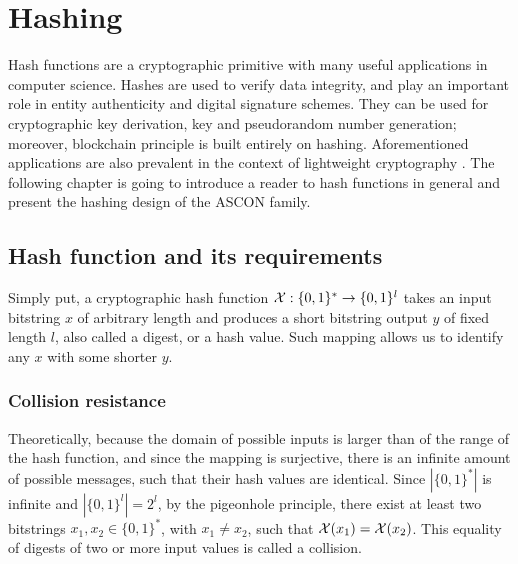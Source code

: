 

\section{Hashing}
Hash functions are a cryptographic primitive with many useful applications in computer science. Hashes are used to verify data integrity, and play an important role in entity authenticity and digital signature schemes. They can be used for cryptographic key derivation, key and pseudorandom number generation; moreover, blockchain principle is built entirely on hashing. Aforementioned applications are also prevalent in the context of lightweight cryptography \cite{lightHashTrends}. The following chapter is going to introduce a reader to hash functions in general and present the hashing design of the ASCON family.

\subsection[hash_def_reqs]{Hash function and its requirements}
Simply put, a cryptographic hash function $ \mathcal{X}: \{0, 1\}^* \rightarrow \{0,1\}^{l} $ takes an input bitstring $x$ of arbitrary length and produces a short bitstring output $y$ of fixed length $l$, also called a digest, or a hash value. Such mapping allows us to identify any $x$ with some shorter $y$. 

\subsubsection{Collision resistance}
Theoretically, because the domain of possible inputs is larger than of the range of the hash function, and since the mapping is surjective, there is an infinite amount of possible messages, such that their hash values are identical. Since $ |\{0,1\}^*| $ is infinite and $ |\{0,1\}^l| = 2^l $, by the pigeonhole principle, there exist at least two bitstrings $ x_1, x_2 \in \{0,1\}^* $, with $ x_1 \neq x_2 $, such that $ \mathcal{X}(x_1) = \mathcal{X}(x_2) $. This equality of digests of two or more input values is called a collision.

